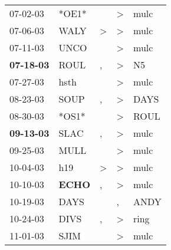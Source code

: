 \begin{supertabular}{p{0.07\textwidth}p{0.06\textwidth}p{0.02\textwidth}p{0.02\textwidth}p{0.06\textwidth}}
          07-02-03\textsuperscript{} &                            *OE1* &                  &     \textgreater &           mulc\textsuperscript{} \\
          07-06-03\textsuperscript{} &           WALY\textsuperscript{} &     \textgreater &     \textgreater &           mulc\textsuperscript{} \\
          07-11-03\textsuperscript{} &           UNCO\textsuperscript{} &                  &     \textgreater &           mulc\textsuperscript{} \\
 \textbf{07-18-03\textsuperscript{}} &           ROUL\textsuperscript{} &                , &     \textgreater &             N5\textsuperscript{} \\
          07-27-03\textsuperscript{} &           hsth\textsuperscript{} &                  &     \textgreater &           mulc\textsuperscript{} \\
          08-23-03\textsuperscript{} &           SOUP\textsuperscript{} &                , &     \textgreater &           DAYS\textsuperscript{} \\
          08-30-03\textsuperscript{} &                            *OS1* &                  &     \textgreater &           ROUL\textsuperscript{} \\
 \textbf{09-13-03\textsuperscript{}} &           SLAC\textsuperscript{} &                , &     \textgreater &           mulc\textsuperscript{} \\
          09-25-03\textsuperscript{} &           MULL\textsuperscript{} &                  &     \textgreater &           mulc\textsuperscript{} \\
          10-04-03\textsuperscript{} &            h19\textsuperscript{} &     \textgreater &     \textgreater &           mulc\textsuperscript{} \\
          10-10-03\textsuperscript{} &  \textbf{ECHO\textsuperscript{}} &                , &     \textgreater &           mulc\textsuperscript{} \\
          10-19-03\textsuperscript{} &           DAYS\textsuperscript{} &                  &                , &           ANDY\textsuperscript{} \\
          10-24-03\textsuperscript{} &           DIVS\textsuperscript{} &                , &     \textgreater &           ring\textsuperscript{} \\
          11-01-03\textsuperscript{} &           SJIM\textsuperscript{} &                  &     \textgreater &           mulc\textsuperscript{} \\

\end{supertabular}
